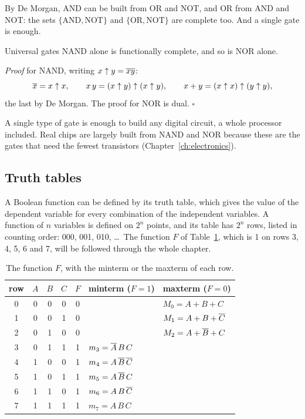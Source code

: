 By De Morgan, AND can be built from OR and NOT, and OR from AND and NOT: the
sets $\{\text{AND},\text{NOT}\}$ and $\{\text{OR},\text{NOT}\}$ are complete
too. And a single gate is enough.

\begin{theorem}{Universal gates}
NAND alone is functionally complete, and so is NOR alone.
\end{theorem}

\noindent\emph{Proof} for NAND, writing $x\uparrow y=\overline{xy}$:
\[
\overline{x}=x\uparrow x,\qquad
x\,y=(x\uparrow y)\uparrow(x\uparrow y),\qquad
x+y=(x\uparrow x)\uparrow(y\uparrow y),
\]
the last by De Morgan. The proof for NOR is dual. \hfill$\square$

\smallskip
A single type of gate is enough to build any digital circuit, a whole
processor included. Real chips are largely built from NAND and NOR because
these are the gates that need the fewest transistors
(Chapter~\ref{ch:electronics}).

\subsection{Truth tables}

A Boolean function can be defined by its truth table, which gives the value
of the dependent variable for every combination of the independent variables.
A function of $n$ variables is defined on $2^{n}$ points, and its table has
$2^{n}$ rows, listed in counting order: 000, 001, 010, \ldots\ The function
$F$ of Table~\ref{tab:b2:F}, which is 1 on rows 3, 4, 5, 6 and 7, will be
followed through the whole chapter.

\begin{table}[htb]
\centering\small
\caption{The function $F$, with the minterm or the maxterm of each
row.}\label{tab:b2:F}
\begin{tabular}{@{}cccc|cll@{}}
\toprule
row & $A$ & $B$ & $C$ & $F$ & \textbf{minterm ($F=1$)} & \textbf{maxterm ($F=0$)}\\
\midrule
0 & 0&0&0 & 0 & & $M_0=A+B+C$\\
1 & 0&0&1 & 0 & & $M_1=A+B+\overline{C}$\\
2 & 0&1&0 & 0 & & $M_2=A+\overline{B}+C$\\
3 & 0&1&1 & 1 & $m_3=\overline{A}\,B\,C$ & \\
4 & 1&0&0 & 1 & $m_4=A\,\overline{B}\,\overline{C}$ & \\
5 & 1&0&1 & 1 & $m_5=A\,\overline{B}\,C$ & \\
6 & 1&1&0 & 1 & $m_6=A\,B\,\overline{C}$ & \\
7 & 1&1&1 & 1 & $m_7=A\,B\,C$ & \\
\bottomrule
\end{tabular}
\end{table}

